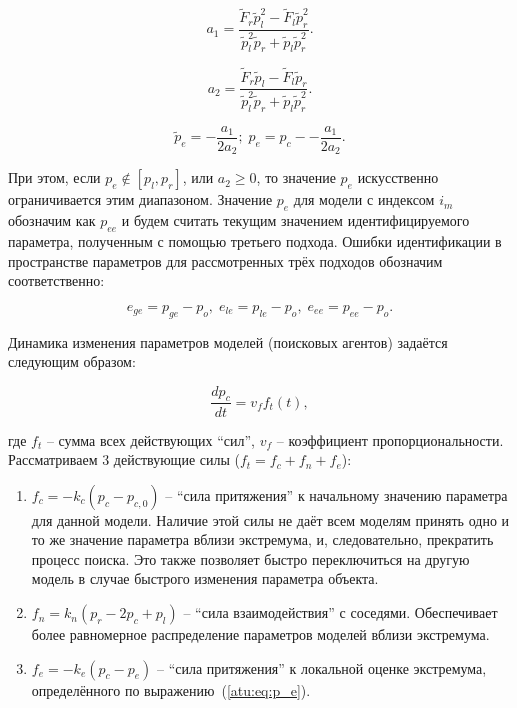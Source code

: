 \documentclass[a4paper,paratype,12pt,fouriernc]{cmonogra}
\begin{document}
\[
  a_1 = \frac{\tilde{F}_r \tilde{p}_l^2 - \tilde{F}_l \tilde{p}_r^2 }
             { \tilde{p}_l^2 \tilde{p}_r  + \tilde{p}_l \tilde{p}_r^2 }.
\]

\[
  a_2 = \frac{\tilde{F}_r \tilde{p}_l - \tilde{F}_l \tilde{p}_r }
             { \tilde{p}_l^2 \tilde{p}_r  + \tilde{p}_l \tilde{p}_r^2 }.
\]

\begin{equation}
  \tilde{p}_e = - \frac{a_1}{2 a_2};
  \;
  p_e = p_c -- \frac{a_1}{2 a_2}.
  \label{atu:eq:p_e}
\end{equation}


При этом, если
$ p_e \notin [ p_l, p_r ] $, или $ a_2 \ge 0 $, то значение $p_e$ искусственно
ограничивается этим диапазоном. Значение $p_e$ для модели с индексом
$i_m$ обозначим как $p_{ee}$ и будем считать
текущим значением идентифицируемого параметра, полученным с помощью
третьего подхода. Ошибки идентификации в пространстве параметров
для рассмотренных трёх подходов обозначим соответственно:

\begin{equation}
  e_{ge} = p_{ge} - p_o, \;
  e_{le} = p_{le} - p_o, \;
  e_{ee} = p_{ee} - p_o.
  \label{atu:eq:e_xx}
\end{equation}


Динамика изменения параметров моделей (поисковых агентов) задаётся следующим образом:

\begin{equation}
  \frac{dp_c}{dt} = v_f f_t(t),
  \label{atu:eq:dp_dt}
\end{equation}

\noindent
где $f_t$ -- сумма всех действующих ``сил'', $v_f$ -- коэффициент
пропорциональности. Рассматриваем 3 действующие силы
($ f_t = f_c + f_n + f_e $):

\begin{enumerate}
  \item
    $f_c = -k_c (p_c - p_{c,0}) $ -- ``сила притяжения'' к начальному значению
    параметра
    для данной модели. Наличие этой силы не даёт всем моделям принять одно
    и то же значение параметра вблизи экстремума, и, следовательно,
    прекратить процесс поиска. Это также позволяет быстро переключиться
    на другую модель в случае быстрого изменения параметра объекта.

  \item
    $f_n = k_n ( p_r - 2 p_c + p_l ) $ -- ``сила взаимодействия''
    с соседями. Обеспечивает более равномерное распределение
    параметров моделей вблизи экстремума.

  \item
    $f_e = - k_e ( p_c - p_e ) $ -- ``сила притяжения'' к локальной
    оценке экстремума, определённого по выражению~(\ref{atu:eq:p_e}).

\end{enumerate}
\end{document}
